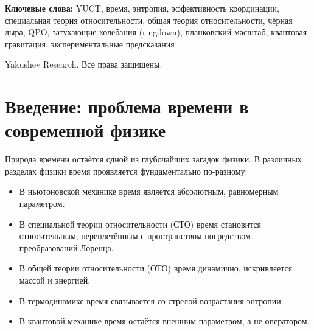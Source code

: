 \documentclass[12pt,a4paper]{article}
\begin{document}
\begin{titlepage}
\begin{center}
\begin{minipage}{0.9\textwidth}
\begin{abstract}
					Мы расширяем рамки на чёрные дыры, показывая, что масштабирование флуктуаций времени с массой следует универсальному показателю \(\beta = 0.67\). Относительная неопределённость темпа времени масштабируется как \(\delta\tau/\tau \propto M^{-0.67}\), что приводит к конкретным проверяемым предсказаниям: (i) ширина квазипериодических осцилляций (QPO) в аккреционных дисках чёрных дыр должна масштабироваться с массой как \(\Delta\nu/\nu \propto M^{-0.67}\); (ii) дисперсия частот затухающих колебаний (ringdown) при слиянии чёрных дыр должна уменьшаться с массой по тому же закону. Эти предсказания можно проверить с помощью существующих рентгеновских данных (RXTE, NuSTAR) и наблюдений гравитационных волн (LIGO/Virgo, будущий телескоп Эйнштейна). Данная структура объединяет релятивистские, гравитационные и термодинамические аспекты времени, предоставляя согласованную картину, согласующуюся с универсальным законом масштабирования \(\beta = 0.67\) (приложение L) и эволюционной динамикой сложных систем (приложение T).
				\end{abstract}
			\end{minipage}
			
			\vspace{1cm}
			
			\noindent
			\small\textbf{Ключевые слова:} YUCT, время, энтропия, эффективность координации, специальная теория относительности, общая теория относительности, чёрная дыра, QPO, затухающие колебания (ringdown), планковский масштаб, квантовая гравитация, экспериментальные предсказания
			
			\vspace{0.5cm}
			
			\noindent
			 Yakushev Research. Все права защищены.
		\end{center}
	\end{titlepage}
	
	\tableofcontents
	\newpage
	
	\section{Введение: проблема времени в современной физике}
	\label{sec:intro}
	
	Природа времени остаётся одной из глубочайших загадок физики. В различных разделах физики время проявляется фундаментально по-разному:
	\begin{itemize}
		\item В ньютоновской механике время является абсолютным, равномерным параметром.
		\item В специальной теории относительности (СТО) время становится относительным, переплетённым с пространством посредством преобразований Лоренца.
		\item В общей теории относительности (ОТО) время динамично, искривляется массой и энергией.
		\item В термодинамике время связывается со стрелой возрастания энтропии.
		\item В квантовой механике время остаётся внешним параметром, а не оператором.
	\end{itemize}
	
\end{document}

